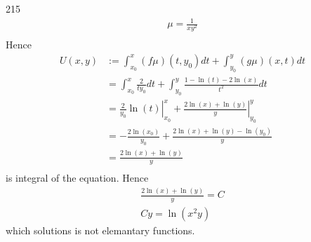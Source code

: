 \documentclass[12pt,a4paper]{article}
\begin{document}
\begin{problem}{215}
\begin{gather*}
            \mu = \frac{1}{x y^2}\\
        \end{gather*}
        Hence
        \begin{align*}
            U(x, y)
            &:= \int_{x_0}^x (f\mu)(t, y_0) dt + \int_{y_0}^y (g\mu)(x, t) dt\\
            &= \int_{x_0}^x \frac{2}{t y_0} dt + \int_{y_0}^y \frac{1 - \ln(t) - 2\ln(x)}{t^2} dt\\
            &= \left.\frac{2}{y_0} \ln(t)\right|_{x_0}^x + \left.\frac{2 \ln(x) + \ln(y)}{y}\right|_{y_0}^y\\
            &= -\frac{2\ln(x_0)}{y_0} + \frac{2 \ln(x) + \ln(y) - \ln(y_0)}{y}\\
            &= \frac{2 \ln(x) + \ln(y)}{y}\\
        \end{align*}
        is integral of the equation. Hence
        \begin{gather*}
            \frac{2 \ln(x) + \ln(y)}{y} = C\\
            Cy = \ln(x^2 y)
        \end{gather*}
        which solutions is not elemantary functions.
    \end{problem}
\end{document}
